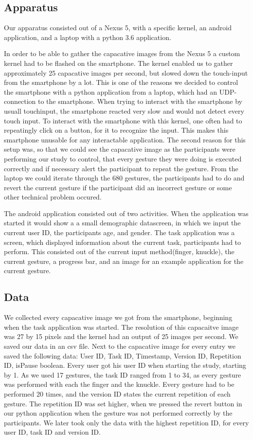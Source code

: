 \documentclass[sigchi-a, authorversion]{acmart}
\begin{document}
\subsection{Apparatus}
Our apparatus consisted out of a Nexus 5, with a specific kernel, an android application, and a laptop with a python 3.6 application.

In order to be able to gather the capacative images from the Nexus 5 a custom kernel had to be flashed on the smartphone.
The kernel enabled us to gather approximately 25 capacative images per second, but slowed down the touch-input from the smartphone by a lot.
This is one of the reasons we decided to control the smartphone with a python application from a laptop, which had an UDP-connection to the smartphone.
When trying to interact with the smartphone by usuall touchinput, the smartphone reacted very slow and would not detect every touch input.
To interact with the smartphone with this kernel, one often had to repeatingly click on a button, for it to recognize the input.
This makes this smartphone unusable for any interactable application.
The second reason for this setup was, so that we could see the capacative image as the participants were performing our study to control, that every gesture they were doing is executed correctly and if necessary alert the participant to repeat the gesture.
From the laptop we could iterate through the 680 gestures, the participants had to do and revert the current gesture if the participant did an incorrect gesture or some other technical problem occured.

The android application consisted out of two activities.
When the application was started it would show a a small demographic datascreen, in which we input the current user ID, the participants age, and gender.
The task application was a screen, which displayed information about the current task, participants had to perform.
This consisted out of the current input method(finger, knuckle), the current gesture, a progress bar, and an image for an example application for the current gesture.

\subsection{Data}
We collected every capacative image we got from the smartphone, beginning when the task application was started.
The resolution of this capacaitve image was 27 by 15 pixels and the kernel had an output of 25 images per second.
We saved our data in an csv file.
Next to the capacative image for every entry we saved the following data: User ID, Task ID, Timestamp, Version ID, Repetition ID, isPause boolean.
Every user got his user ID when starting the study, starting by 1.
As we used 17 gestures, the task ID ranged from 1 to 34, as every gesture was performed with each the finger and the knuckle.
Every gesture had to be performed 20 times, and the version ID states the current repetition of each gesture.
The repetition ID was set higher, when we pressed the revert button in our python application when the gesture was not performed correctly by the participants.
We later took only the data with the highest repetition ID, for every user ID, task ID and version ID.
\end{document}
